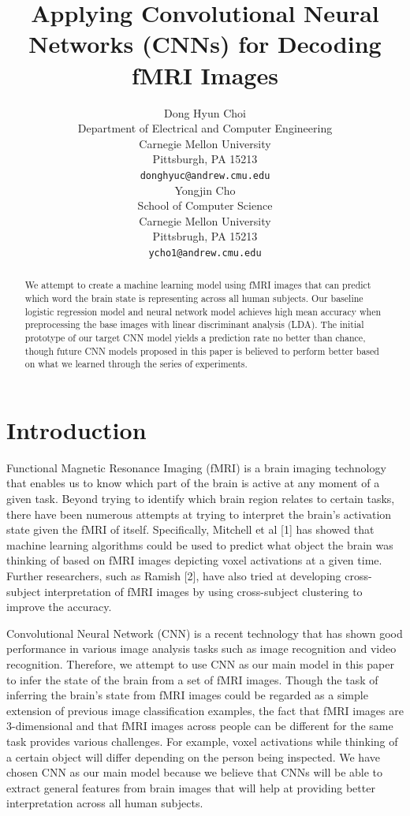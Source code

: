 \documentclass{article} %
\title{Applying Convolutional Neural Networks (CNNs) for Decoding fMRI Images}
\author{
Dong Hyun Choi \\
Department of Electrical and Computer Engineering\\
Carnegie Mellon University\\
Pittsburgh, PA 15213 \\
\texttt{donghyuc@andrew.cmu.edu} \\
\And
Yongjin Cho \\
School of Computer Science \\
Carnegie Mellon University \\
Pittsbrugh, PA 15213\\
\texttt{ycho1@andrew.cmu.edu} \\
}
\begin{document}
\maketitle

\begin{abstract}
We attempt to create a machine learning model using fMRI images that can predict which word the brain state is representing across all human subjects. Our baseline logistic regression model and neural network model achieves high mean accuracy when preprocessing the base images with linear discriminant analysis (LDA). The initial prototype of our target CNN model yields a prediction rate no better than chance, though future CNN models proposed in this paper is believed to perform better based on what we learned through the series of experiments.
\end{abstract}

\section{Introduction}

Functional Magnetic Resonance Imaging (fMRI) is a brain imaging technology that enables us to know which part of the brain is active at any moment of a given task. Beyond trying to identify which brain region relates to certain tasks, there have been numerous attempts at trying to interpret the brain's activation state given the fMRI of itself. Specifically, Mitchell et al [1] has showed that machine learning algorithms could be used to predict what object the brain was thinking of based on fMRI images depicting voxel activations at a given time. Further researchers, such as Ramish [2], have also tried at developing cross-subject interpretation of fMRI images by using cross-subject clustering to improve the accuracy.

Convolutional Neural Network (CNN) is a recent technology that has shown good performance in various image analysis tasks such as image recognition and video recognition. Therefore, we attempt to use CNN as our main model in this paper to infer the state of the brain from a set of fMRI images. Though the task of inferring the brain's state from fMRI images could be regarded as a simple extension of previous image classification examples, the fact that fMRI images are 3-dimensional and that fMRI images across people can be different for the same task provides various challenges. For example, voxel activations while thinking of a certain object will differ depending on the person being inspected. We have chosen CNN as our main model because we believe that CNNs will be able to extract general features from brain images that will help at providing better interpretation across all human subjects.
\end{document}

